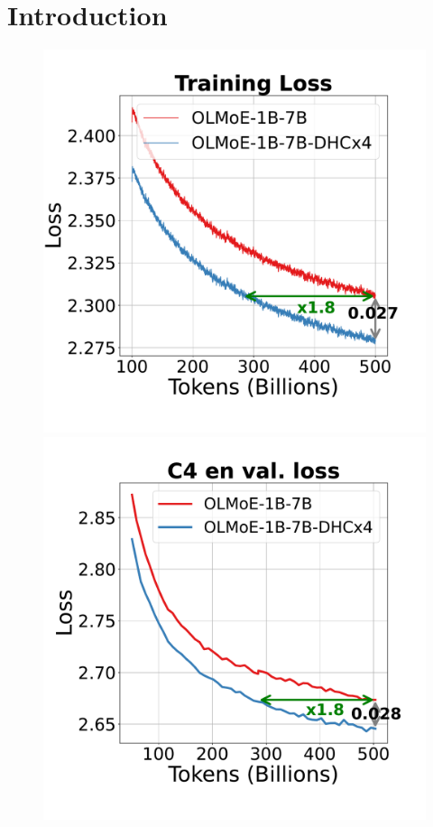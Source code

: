 \documentclass{article} %
\begin{document}
\section{Introduction}
\begin{figure}[h]
    \centering
    \begin{minipage}{0.25\textwidth}
        \centering
        \includegraphics[width=\linewidth]{fig/train_loss_olmoe_exp_099.pdf}
        
    \end{minipage}\hfill
    \begin{minipage}{0.25\textwidth}
        \centering
        \includegraphics[width=\linewidth]{fig/OLMoE_1B7B_c4_en_val_loss.pdf}


\end{minipage}
\end{figure}
\end{document}
